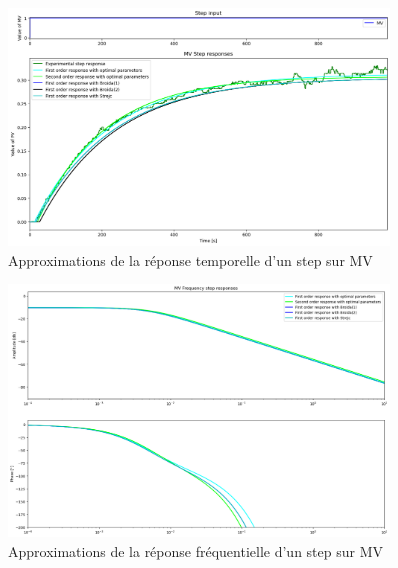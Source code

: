 \begin{figure}[H]
    \centering
    \includegraphics[width=0.9\textwidth]{../Plots/MV_Approximations_comparison_time.png}
    \caption{Approximations de la réponse temporelle d'un step sur MV}
    \label{fig:MV_approximation_comparison_time}
\end{figure}
\begin{figure}[H]
    \centering
    \includegraphics[width=0.9\textwidth]{../Plots/MV_Approximations_comparison_frequency.png}
    \caption{Approximations de la réponse fréquentielle d'un step sur MV}
    \label{fig:MV_approximation_comparison_frequency}
\end{figure}

